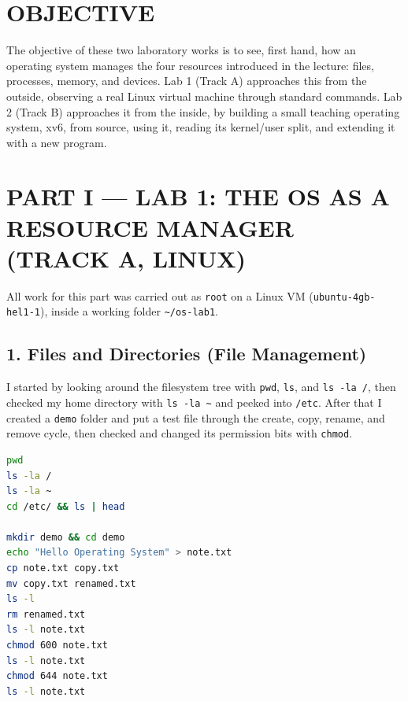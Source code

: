 \section*{OBJECTIVE}

\hspace{0.8cm} The objective of these two laboratory works is to see, first hand,
how an operating system manages the four resources introduced in the lecture:
files, processes, memory, and devices. Lab 1 (Track A) approaches this from the
outside, observing a real Linux virtual machine through standard commands. Lab 2
(Track B) approaches it from the inside, by building a small teaching operating
system, xv6, from source, using it, reading its kernel/user split, and extending
it with a new program.

\section*{PART I --- LAB 1: THE OS AS A RESOURCE MANAGER (TRACK A, LINUX)}

\hspace{0.8cm} All work for this part was carried out as \texttt{root} on a
Linux VM (\texttt{ubuntu-4gb-hel1-1}), inside a working folder
\texttt{\textasciitilde/os-lab1}.

\subsection*{1. Files and Directories (File Management)}

\hspace{0.8cm} I started by looking around the filesystem tree with \texttt{pwd},
\texttt{ls}, and \texttt{ls -la /}, then checked my home directory with
\texttt{ls -la \textasciitilde} and peeked into \texttt{/etc}. After that I created
a \texttt{demo} folder and put a test file through the create, copy, rename, and
remove cycle, then checked and changed its permission bits with \texttt{chmod}.

\begin{lstlisting}[language=bash, caption={Commands run for file management}]
pwd
ls -la /
ls -la ~
cd /etc/ && ls | head

mkdir demo && cd demo
echo "Hello Operating System" > note.txt
cp note.txt copy.txt
mv copy.txt renamed.txt
ls -l
rm renamed.txt
ls -l note.txt
chmod 600 note.txt
ls -l note.txt
chmod 644 note.txt
ls -l note.txt
\end{lstlisting}

